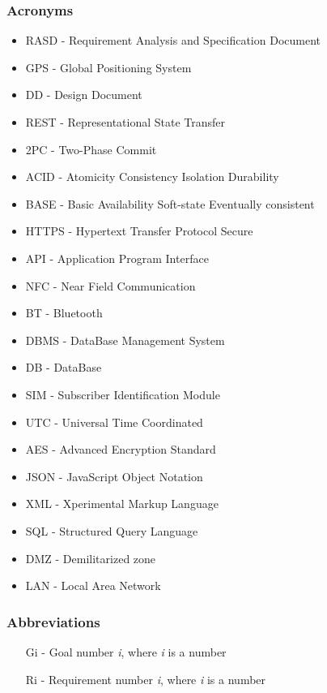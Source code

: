 \subsubsection{Acronyms}
\begin{itemize}
\item RASD - Requirement Analysis and Specification Document
\item GPS - Global Positioning System
\item DD - Design Document
\item REST - Representational State Transfer
\item 2PC - Two-Phase Commit
\item ACID - Atomicity Consistency Isolation Durability
\item BASE - Basic Availability Soft-state Eventually consistent
\item HTTPS - Hypertext Transfer Protocol Secure
\item API - Application Program Interface
\item NFC - Near Field Communication
\item BT - Bluetooth
\item DBMS - DataBase Management System
\item DB - DataBase
\item SIM - Subscriber Identification Module
\item UTC - Universal Time Coordinated
\item AES - Advanced Encryption Standard
\item JSON - JavaScript Object Notation
\item XML - Xperimental Markup Language
\item SQL - Structured Query Language
\item DMZ - Demilitarized zone
\item LAN - Local Area Network
\end{itemize}

\subsubsection{Abbreviations}
\begin{itemize}
\item [Gi] - Goal number \textit{i}, where \textit{i} is a number
\item [Ri] - Requirement number \textit{i}, where \textit{i} is a number
\end{itemize}
